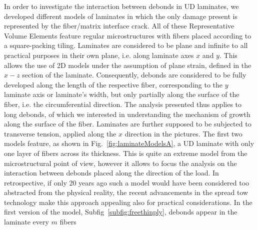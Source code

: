 \documentclass[review]{elsarticle}
\begin{document}
In order to investigate the interaction between debonds in UD laminates, we developed different models of laminates in which the only damage present is represented by the fiber/matrix interface crack. All of these Representative Volume Elements feature regular microstructures with fibers placed according to a square-packing tiling. Laminates are considered to be plane and infinite to all practical purposes in their own plane, i.e. along laminate axes $x$ and $y$. This allows the use of 2D models under the assumption of plane strain, defined in the $x-z$ section of the laminate. Consequently, debonds are considered to be fully developed along the length of the respective fiber, corresponding to the $y$ laminate axis or laminate's width, but only partially along the surface of the fiber, i.e. the circumferential direction. The analysis presented thus applies to long debonds, of which we interested in understanding the mechanism of growth along the surface of the fiber. Laminates are further supposed to be subjected to transverse tension, applied along the $x$ direction in the pictures. 
The first two models feature, as shown in Fig.~\ref{fig:laminateModelsA}, a UD laminate with only one layer of fibers across its thickness. This is quite an extreme model from the microstructural point of view, however it allows to focus the analysis on the interaction between debonds placed along the direction of the load. In retrospective, if only 20 years ago such a model would have been considered too abstracted from the physical reality, the recent advancements in the spread tow technology make this approach appealing also for practical considerations. In the first version of the model, Subfig~\ref{subfig:freethinply}, debonds appear in the laminate every $m$ fibers
\end{document}
